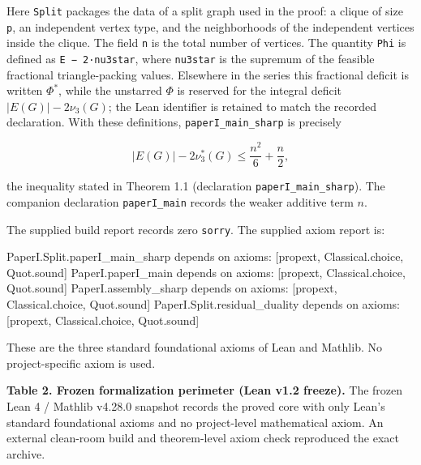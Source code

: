 \documentclass[
  american,
  11pt,
  a4paper,
]{article}
\newenvironment{Shaded}{}{}
\newcommand{\NormalTok}[1]{#1}
\begin{document}
Here \texttt{Split} packages the data of a split graph used in the proof: a clique of size \texttt{p}, an independent vertex type, and the neighborhoods of the independent vertices inside the clique. The field \texttt{n} is the total number of vertices. The quantity \texttt{Phi} is defined as \texttt{\textbar{}E\textbar{}\ −\ 2·nu3star}, where \texttt{nu3star} is the supremum of the feasible fractional triangle-packing values. Elsewhere in the series this fractional deficit is written \(\Phi^*\), while the unstarred \(\Phi\) is reserved for the integral deficit \(|E(G)|-2\nu_3(G)\); the Lean identifier is retained to match the recorded declaration. With these definitions, \texttt{paperI\_main\_sharp} is precisely

\[
|E(G)|-2\nu_3^*(G)\le \frac{n^2}{6}+\frac{n}{2},
\]

the inequality stated in Theorem 1.1 (declaration \texttt{paperI\_main\_sharp}). The companion declaration \texttt{paperI\_main} records the weaker additive term \(n\).

The supplied build report records zero \texttt{sorry}. The supplied axiom report is:

\begin{Shaded}
\begin{Highlighting}[]
\NormalTok{PaperI.Split.paperI\_main\_sharp depends on axioms: [propext, Classical.choice, Quot.sound]}
\NormalTok{PaperI.paperI\_main         depends on axioms: [propext, Classical.choice, Quot.sound]}
\NormalTok{PaperI.assembly\_sharp      depends on axioms: [propext, Classical.choice, Quot.sound]}
\NormalTok{PaperI.Split.residual\_duality depends on axioms: [propext, Classical.choice, Quot.sound]}
\end{Highlighting}
\end{Shaded}

These are the three standard foundational axioms of Lean and Mathlib. No project-specific axiom is used.

\textbf{Table 2. Frozen formalization perimeter (Lean v1.2 freeze).} The frozen Lean 4 / Mathlib v4.28.0 snapshot records the proved core with only Lean's standard foundational axioms and no project-level mathematical axiom. An external clean-room build and theorem-level axiom check reproduced the exact archive.
\end{document}
